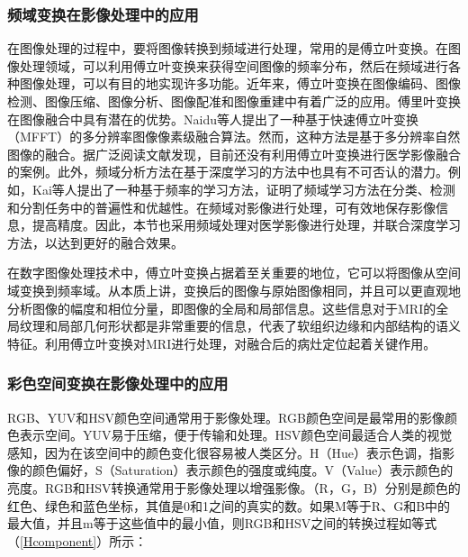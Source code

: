 \subsubsection{频域变换在影像处理中的应用}
在图像处理的过程中，要将图像转换到频域进行处理，常用的是傅立叶变换。在图像处理领域，可以利用傅立叶变换来获得空间图像的频率分布，然后在频域进行各种图像处理，可以有目的地实现许多功能。近年来，傅立叶变换在图像编码\cite{abiko2019image}、图像检测\cite{kuo2020fast}、图像压缩\cite{bag2021lossy}、图像分析\cite{2012Joint,2020Joint}、图像配准\cite{atta2018joint}和图像重建\cite{pezzotti2017Efficient}中有着广泛的应用。傅里叶变换在图像融合中具有潜在的优势。Naidu等人\cite{Naidu2011Multi}提出了一种基于快速傅立叶变换（MFFT）的多分辨率图像像素级融合算法。然而，这种方法是基于多分辨率自然图像的融合。据广泛阅读文献发现，目前还没有利用傅立叶变换进行医学影像融合的案例。此外，频域分析方法在基于深度学习的方法中也具有不可否认的潜力。例如，Kai等人\cite{xu2020learning}提出了一种基于频率的学习方法，证明了频域学习方法在分类、检测和分割任务中的普遍性和优越性。在频域对影像进行处理，可有效地保存影像信息，提高精度。因此，本节也采用频域处理对医学影像进行处理，并联合深度学习方法，以达到更好的融合效果。

在数字图像处理技术中，傅立叶变换占据着至关重要的地位，它可以将图像从空间域变换到频率域。从本质上讲，变换后的图像与原始图像相同，并且可以更直观地分析图像的幅度和相位分量，即图像的全局和局部信息。这些信息对于MRI的全局纹理和局部几何形状都是非常重要的信息，代表了软组织边缘和内部结构的语义特征。利用傅立叶变换对MRI进行处理，对融合后的病灶定位起着关键作用。

\subsubsection{彩色空间变换在影像处理中的应用}
RGB、YUV和HSV颜色空间通常用于影像处理。RGB颜色空间是最常用的影像颜色表示空间。YUV易于压缩，便于传输和处理。HSV颜色空间最适合人类的视觉感知，因为在该空间中的颜色变化很容易被人类区分。H（Hue）表示色调，指影像的颜色偏好，S（Saturation）表示颜色的强度或纯度。V（Value）表示颜色的亮度。RGB和HSV转换通常用于影像处理以增强影像\cite{peng2018multi}。（R，G，B）分别是颜色的红色、绿色和蓝色坐标，其值是0和1之间的真实的数。如果M等于R、G和B中的最大值，并且m等于这些值中的最小值，则RGB和HSV之间的转换过程如等式（\ref{Hcomponent}）所示：


